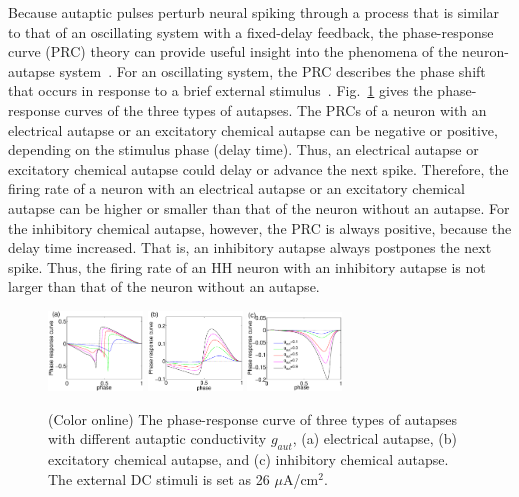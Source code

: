 \documentclass[twocolumn,showpacs,preprintnumbers,amsmath,amssymb,pre,superscriptaddress]{revtex4-1}
\begin{document}
\begin{CJK}{UTF8}{gbsn}
Because autaptic pulses perturb neural spiking through a process that is similar to that of an oscillating system with a fixed-delay feedback, the phase-response curve (PRC) theory can provide useful insight into the phenomena of the neuron-autapse system~\cite{glass1,glass2,glass3,glass4}. For an oscillating system, the PRC describes the phase shift that occurs in response to a brief external stimulus~\cite{Carmen1,Carmen2}. Fig.~\ref{rep_fig2} gives the phase-response curves of the three types of autapses. The PRCs of a neuron with an electrical autapse or an excitatory chemical autapse can be negative or positive, depending on the stimulus phase (delay time). Thus, an electrical autapse or excitatory chemical autapse could delay or advance the next spike. Therefore, the firing rate of a neuron with an electrical autapse or an excitatory chemical autapse can be higher or smaller than that of the neuron without an autapse. For the inhibitory chemical autapse, however, the PRC is always positive, because the delay time increased. That is, an inhibitory autapse always postpones the next spike. Thus, the firing rate of an HH neuron with an inhibitory autapse is not larger than that of the neuron without an autapse.
\begin{figure}
\begin{center}
\includegraphics[width=0.224\textwidth]{fig8_prc_electrical_all.eps}
\includegraphics[width=0.224\textwidth]{fig8_prc_excitatory_all.eps}
\includegraphics[width=0.224\textwidth]{fig8_prc_inhibitory_autapse_all.eps}
\caption{(Color online) The phase-response curve of three types of autapses with different autaptic conductivity $g_{aut}$, (a) electrical autapse,  (b) excitatory chemical autapse, and (c) inhibitory chemical autapse. The external DC stimuli is set as 26 $\mu$A/cm$^2$.}
\label{rep_fig2}
\end{center}
\end{figure}


\end{CJK}
\end{document}
